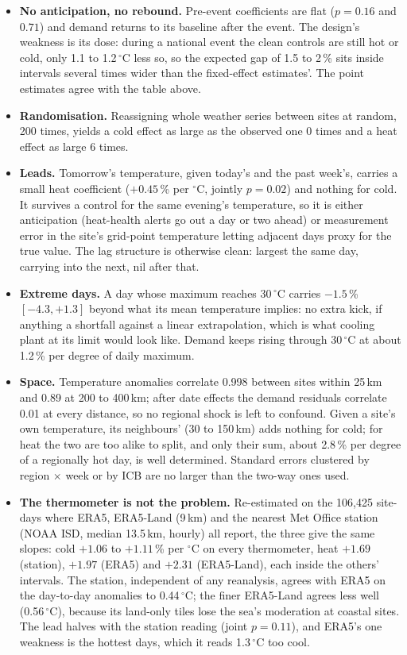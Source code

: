 \documentclass[10pt,a4paper]{article}
\begin{document}
\begin{itemize}
\item \textbf{No anticipation, no rebound.} Pre-event coefficients are flat ($p = 0.16$ and $0.71$) and demand returns to its baseline after the event. The design's weakness is its dose: during a national event the clean controls are still hot or cold, only 1.1 to 1.2\,$^\circ$C less so, so the expected gap of 1.5 to 2\,\% sits inside intervals several times wider than the fixed-effect estimates'. The point estimates agree with the table above.
\item \textbf{Randomisation.} Reassigning whole weather series between sites at random, 200 times, yields a cold effect as large as the observed one 0 times and a heat effect as large 6 times.
\item \textbf{Leads.} Tomorrow's temperature, given today's and the past week's, carries a small heat coefficient ($+0.45$\,\% per $^\circ$C, jointly $p = 0.02$) and nothing for cold. It survives a control for the same evening's temperature, so it is either anticipation (heat-health alerts go out a day or two ahead) or measurement error in the site's grid-point temperature letting adjacent days proxy for the true value. The lag structure is otherwise clean: largest the same day, carrying into the next, nil after that.
\item \textbf{Extreme days.} A day whose maximum reaches 30\,$^\circ$C carries $-1.5$\,\% $[-4.3, +1.3]$ beyond what its mean temperature implies: no extra kick, if anything a shortfall against a linear extrapolation, which is what cooling plant at its limit would look like. Demand keeps rising through 30\,$^\circ$C at about 1.2\,\% per degree of daily maximum.
\item \textbf{Space.} Temperature anomalies correlate 0.998 between sites within 25\,km and 0.89 at 200 to 400\,km; after date effects the demand residuals correlate 0.01 at every distance, so no regional shock is left to confound. Given a site's own temperature, its neighbours' (30 to 150\,km) adds nothing for cold; for heat the two are too alike to split, and only their sum, about 2.8\,\% per degree of a regionally hot day, is well determined. Standard errors clustered by region $\times$ week or by ICB are no larger than the two-way ones used.
\item \textbf{The thermometer is not the problem.} Re-estimated on the 106,425 site-days where ERA5, ERA5-Land (9\,km) and the nearest Met Office station (NOAA ISD, median 13.5\,km, hourly) all report, the three give the same slopes: cold $+1.06$ to $+1.11$\,\% per $^\circ$C on every thermometer, heat $+1.69$ (station), $+1.97$ (ERA5) and $+2.31$ (ERA5-Land), each inside the others' intervals. The station, independent of any reanalysis, agrees with ERA5 on the day-to-day anomalies to 0.44\,$^\circ$C; the finer ERA5-Land agrees less well (0.56\,$^\circ$C), because its land-only tiles lose the sea's moderation at coastal sites. The lead halves with the station reading (joint $p = 0.11$), and ERA5's one weakness is the hottest days, which it reads 1.3\,$^\circ$C too cool.
\end{itemize}
\end{document}
